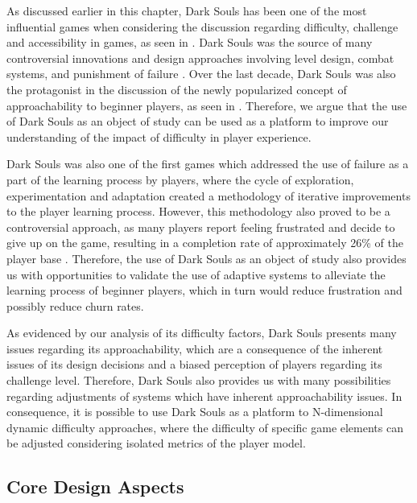 As discussed earlier in this chapter, Dark Souls has been one of the most influential games when considering the discussion regarding difficulty, challenge and accessibility in games, as seen in \cite{ONLINE_GettingWrongDarkSouls}. Dark Souls was the source of many controversial innovations and design approaches involving level design, combat systems, and punishment of failure \cite{ONLINE_ToughLoveDarkSoulsDifficulty}. Over the last decade, Dark Souls was also the protagonist in the discussion of the newly popularized concept of approachability to beginner players, as seen in \cite{ONLINE_ApproachabilityFixDarkSouls}. Therefore, we argue that the use of Dark Souls as an object of study can be used as a platform to improve our understanding of the impact of difficulty in player experience.

Dark Souls was also one of the first games which addressed the use of failure as a part of the learning process by players, where the cycle of exploration, experimentation and adaptation created a methodology of iterative improvements to the player learning process. However, this methodology also proved to be a controversial approach, as many players report feeling frustrated and decide to give up on the game, resulting in a completion rate of approximately 26\% of the player base \cite{ONLINE_ApproachabilityFixDarkSouls}. Therefore, the use of Dark Souls as an object of study also provides us with opportunities to validate the use of adaptive systems to alleviate the learning process of beginner players, which in turn would reduce frustration and possibly reduce churn rates.

As evidenced by our analysis of its difficulty factors, Dark Souls presents many issues regarding its approachability, which are a consequence of the inherent issues of its design decisions and a biased perception of players regarding its challenge level. Therefore, Dark Souls also provides us with many possibilities regarding adjustments of systems which have inherent approachability issues. In consequence, it is possible to use Dark Souls as a platform to N-dimensional dynamic difficulty approaches, where the difficulty of specific game elements can be adjusted considering isolated metrics of the player model.

\subsection{Core Design Aspects}

